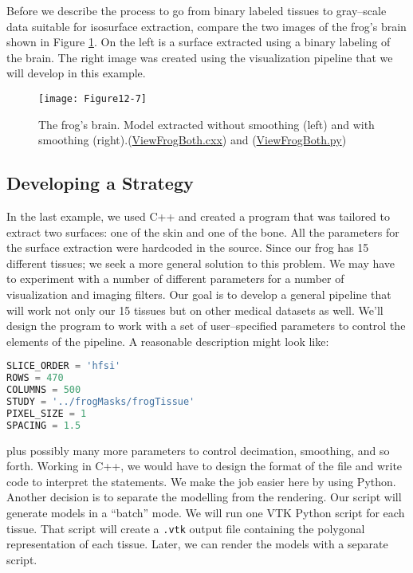 Before we describe the process to go from binary labeled tissues to gray--scale data suitable for isosurface extraction, compare the two images of the frog's brain shown in Figure \ref{fig:Figure12-7}. On the left is a surface extracted using a binary labeling of the brain. The right image was created using the visualization pipeline that we will develop in this example.

\begin{figure}[!htb]
    \centering
    \texttt{[image: Figure12-7]}
    \caption{The frog's brain. Model extracted without smoothing (left) and with smoothing (right).(\href{https://lorensen.github.io/VTKExamples/site/Cxx/Visualization/ViewFrogBoth/}{ViewFrogBoth.cxx}) and (\href{https://lorensen.github.io/VTKExamples/site/Python/Visualization/ViewFrogBoth/}{ViewFrogBoth.py})}
    \label{fig:Figure12-7}
\end{figure}

\subsection{Developing a Strategy}

In the last example, we used C++ and created a program that was tailored to extract two surfaces: one of the skin and one of the bone. All the parameters for the surface extraction were hardcoded in the source. Since our frog has 15 different tissues; we seek a more general solution to this problem. We may have to experiment with a number of different parameters for a number of visualization and imaging filters. Our goal is to develop a general pipeline that will work not only our 15 tissues but on other medical datasets as well. We'll design the program to work with a set of user--specified parameters to control the elements of the pipeline. A reasonable description might look like:

\begin{lstlisting}[language=Python, caption={User specified parameters to control the elements of the pipeline.}]
SLICE_ORDER = 'hfsi'
ROWS = 470
COLUMNS = 500
STUDY = '../frogMasks/frogTissue'
PIXEL_SIZE = 1
SPACING = 1.5
\end{lstlisting}

\noindent plus possibly many more parameters to control decimation, smoothing, and so forth. Working in C++, we would have to design the format of the file and write code to interpret the statements. We make the job easier here by using Python. Another decision is to separate the modelling from the rendering. Our script will generate models in a ``batch'' mode. We will run one VTK Python script for each tissue. That script will create a \texttt{.vtk} output file containing the polygonal representation of each tissue. Later, we can render the models with a separate script.

